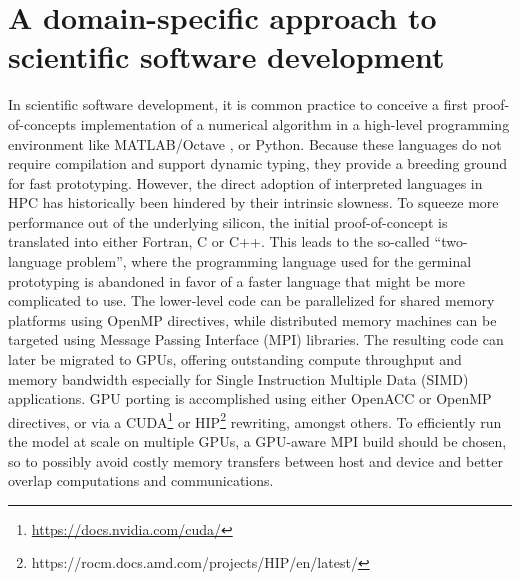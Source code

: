 \documentclass[gmd,manuscript,online]{copernicus}
\theoremstyle{theorem}
\theoremstyle{definition}
\theoremstyle{remark}
\theoremstyle{proposition}
\begin{document}
	\section{A domain-specific approach to scientific software development}
	\label{section:domain-specific-approach-to-scientific-software-development}

	In scientific software development, it is common practice to conceive a first proof-of-concepts implementation of a numerical algorithm in a high-level programming environment like MATLAB/Octave \citep{lindfield18}, or Python. Because these languages do not require compilation and support dynamic typing, they provide a breeding ground for fast prototyping. However, the direct adoption of interpreted languages in HPC has historically been hindered by their intrinsic slowness. To squeeze more performance out of the underlying silicon, the initial proof-of-concept is translated into either Fortran, C or C++. This leads to the so-called ``two-language problem'', where the programming language used for the germinal prototyping is abandoned in favor of a faster language that might be more complicated to use. The lower-level code can be parallelized for shared memory platforms using OpenMP directives, while distributed memory machines can be targeted using Message Passing Interface (MPI) libraries. %
	The resulting code can later be migrated to GPUs, offering outstanding compute throughput and memory bandwidth especially for Single Instruction Multiple Data (SIMD) applications. GPU porting is accomplished using either OpenACC or OpenMP directives, or via a CUDA\footnote{\url{https://docs.nvidia.com/cuda/}} or HIP\footnote{{https://rocm.docs.amd.com/projects/HIP/en/latest/}} rewriting, amongst others. To efficiently run the model at scale on multiple GPUs, a GPU-aware MPI build should be chosen, so to possibly avoid costly memory transfers between host and device and better overlap computations and communications.
\end{document}
